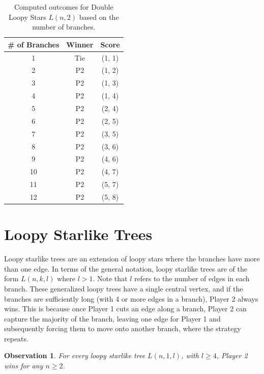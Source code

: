 \documentclass{article}
\newtheorem{observation}[theorem]{Observation}
\begin{document}
\begin{table}[hbt!]
\centering
\begin{tabular}{|c|c|c|}
\hline
\textbf{\# of Branches} & \textbf{Winner} & \textbf{Score} \\
\hline
1 & Tie & (1, 1) \\
2 & P2 & (1, 2) \\
3 & P2 & (1, 3) \\
4 & P2 & (1, 4) \\
5 & P2 & (2, 4) \\
6 & P2 & (2, 5) \\
7 & P2 & (3, 5) \\
8 & P2 & (3, 6) \\
9 & P2 & (4, 6) \\
10 & P2 & (4, 7) \\
11 & P2 & (5, 7) \\
12 & P2 & (5, 8) \\
\hline
\end{tabular}
\caption{Computed outcomes for Double Loopy Stars $L(n,2)$ based on the number of branches.}
\label{table:double-loopy-star-outcomes}
\end{table}
\FloatBarrier

\section{Loopy Starlike Trees}
Loopy starlike trees are an extension of loopy stars where the branches have more than one edge.  In terms of the general notation, loopy starlike trees are of the form $L(n,k,l)$ where $l > 1$. Note that $l$ refers to the number of edges in each branch. These generalized loopy trees have a single central vertex, and if the branches are sufficiently long (with 4 or more edges in a branch), Player 2 always wins. This is because once Player 1 cuts an edge along a branch, Player 2 can capture the majority of the branch, leaving one edge for Player 1 and subsequently forcing them to move onto another branch, where the strategy repeats.

\begin{observation}
For every loopy starlike tree $L(n, 1, l)$, with $l \geq 4$, Player 2 wins for any $n \geq 2$.
\end{observation}
\end{document}
